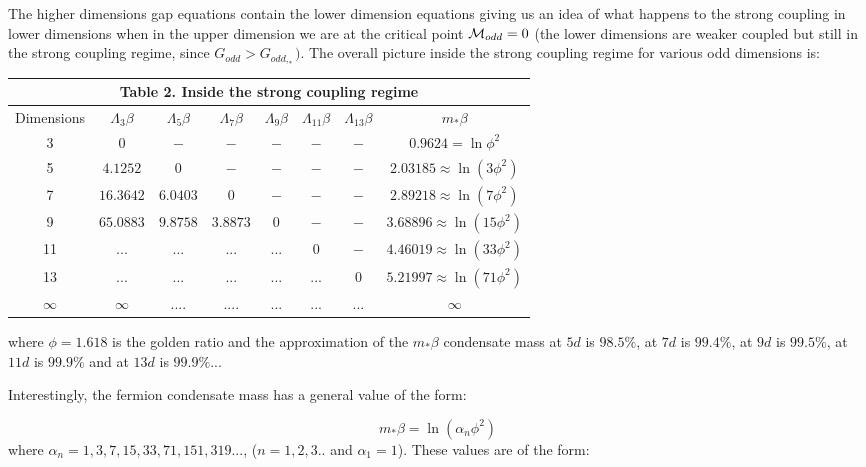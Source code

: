\documentclass[twoside]{article}
\begin{document}
The higher dimensions gap equations contain the lower dimension equations giving us an idea of what happens to the strong coupling in lower dimensions when in the upper dimension we are at the critical point ${\cal M}_{odd}=0$ (the lower dimensions are weaker coupled but still in  the strong coupling regime, since $G_{odd}>G_{odd,_*})$. The overall picture inside the strong coupling regime for various odd dimensions is:

{\centering
	\begin{tabular}{|c|c|c|c|c|c|c|c|}
		\hline 
		\multicolumn{8}{|c|}{\textbf{Table 2. Inside the strong coupling regime}} \\ 
		\hline 
		Dimensions & $\Lambda_3\beta$ & $\Lambda_5\beta$ & $\Lambda_7\beta$ & $\Lambda_9\beta$ & $\Lambda_{11}\beta$ & $\Lambda_{13}\beta$ & $m_*\beta$ \\ 
		\hline 
		3 & $0$ & $-$ & $-$ & $-$ & $-$ & $-$ & $0.9624=\ln\phi^2$ \\ 
		\hline 
		5 & $4.1252$ & $0$ & $-$ & $-$ & $-$ & $-$ & $2.03185\approx\ln(3\phi^2)$ \\ 
		\hline 
		7 & $16.3642$ & $6.0403$ & $0$ & $-$ & $-$ & $-$ & $2.89218\approx\ln(7\phi^2)$ \\ 
		\hline
		9 & $65.0883$ & $9.8758$ & $3.8873$ & $0$ & $-$ & $-$ & $3.68896\approx\ln(15\phi^2)$ \\ 
		\hline 
		11 & $...$ & $...$ & $...$ & $...$ & $0$ & $-$ & $4.46019\approx\ln(33\phi^2)$\\
		\hline
		13 & $...$ & $...$ & $...$ & $...$ & $...$ & $0$ & $5.21997\approx\ln(71\phi^2)$\\
		\hline
		$\infty$ & $\infty$ &  $....$ & $....$ & $...$ & $...$ & $...$ & $\infty$ \\
		\hline 
	\end{tabular}\par}
	
where $\phi=1.618$ is the golden ratio and the approximation of the $m_*\beta$ condensate mass at $5d$ is $98.5\%$, at $7d$ is $99.4\%$, at $9d$ is $99.5\%$, at $11d$ is $99.9\%$ and at $13d$ is $99.9\%$...

Interestingly, the fermion condensate mass has a general value of the form:

\begin{equation}
\label{mass}
\boxed
{m_*\beta=\ln(\alpha_n\phi^2)}
\end{equation}
where $\alpha_n=1,3,7,15,33,71,151,319...$, ($n=1,2,3..$ and $\alpha_1=1$). These values are of the form:
\end{document}

